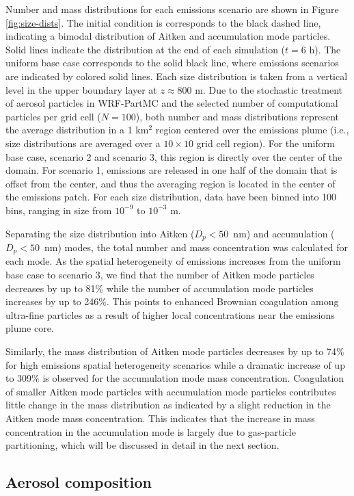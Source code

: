 \documentclass[journal abbreviation, manuscript]{copernicus}
\begin{document}
Number and mass distributions for each emissions scenario are shown in Figure \ref{fig:size-dists}. The initial condition is corresponds to the black dashed line, indicating a bimodal distribution of Aitken and accumulation mode particles. Solid lines indicate the distribution at the end of each simulation ($t=6$ h). The uniform base case corresponds to the solid black line, where emissions scenarios are indicated by colored solid lines.  Each size distribution is taken from a vertical level in the upper boundary layer at $z\approx800$ m. Due to the stochastic treatment of aerosol particles in WRF-PartMC and the selected number of computational particles per grid cell ($N = 100$), both number and mass distributions represent the average distribution in a 1 km$^2$ region centered over the emissions plume (i.e., size distributions are averaged over a $10\times10$ grid cell region). For the uniform base case, scenario 2 and scenario 3, this region is directly over the center of the domain. For scenario 1, emissions are released in one half of the domain that is offset from the center, and thus the averaging region is located in the center of the emissions patch. For each size distribution, data have been binned into 100 bins, ranging in size from $10^{-9}$ to $10^{-3}$ m. 

Separating the size distribution into Aitken ($D_p < 50$~nm) and accumulation ($D_p < 50$~nm) modes, the total number and mass concentration was calculated for each mode. As the spatial heterogeneity of emissions increases from the uniform base case to scenario 3, we find that the number of Aitken mode particles decreases by up to 81\% while the number of accumulation mode particles increases by up to 246\%. This points to enhanced Brownian coagulation among ultra-fine particles as a result of higher local concentrations near the emissions plume core. 

Similarly, the mass distribution of Aitken mode particles decreases by up to 74\% for high emissions spatial heterogeneity scenarios while a dramatic increase of up to 309\% is observed for the accumulation mode mass concentration. Coagulation of smaller Aitken mode particles with accumulation mode particles contributes little change in the mass distribution as indicated by a slight reduction in the Aitken mode mass concentration. This indicates that the increase in mass concentration in the accumulation mode is largely due to gas-particle partitioning, which will be discussed in detail in the next section.


\subsection{Aerosol composition}\label{sec:aero-comp}
\end{document}
